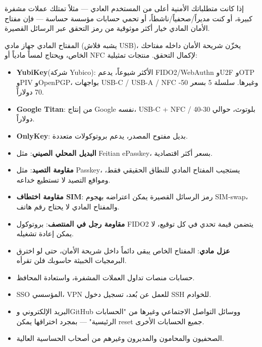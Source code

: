 
إذا كانت متطلباتك الأمنية أعلى من المستخدم العادي — مثلاً تمتلك عملات مشفرة كبيرة، أو كنت مديراً/صحفياً/ناشطاً، أو تحمي حسابات مؤسسة حساسة — فإن مفتاح الأمان المادي خيار أكثر موثوقية من رمز التحقق عبر الرسائل القصيرة.


المفتاح المادي جهاز مادي (يشبه فلاش USB)، يخزّن شريحة الأمان داخله مفتاحك الخاص، ويحتاج لمساً مادياً أو NFC لإكمال التحقق. منتجات تمثيلية:

\begin{itemize}
  \item \textbf{YubiKey}(شركة Yubico): الأكثر شيوعاً، يدعم FIDO2/WebAuthn وU2F وOTP وPIV وOpenPGP، بواجهات USB-C / USB-A / NFC وغيرها. سلسلة 5 بسعر 50-70 دولاراً.
  \item \textbf{Google Titan}: من إنتاج Google نفسه، USB-C + NFC / بلوتوث، حوالي 30-40 دولاراً.
  \item \textbf{OnlyKey}: بديل مفتوح المصدر، يدعم بروتوكولات متعددة.
  \item \textbf{البديل المحلي الصيني}: مثل Feitian ePasskey، بسعر أكثر اقتصادية.
\end{itemize}


\begin{itemize}
  \item \textbf{مقاومة التصيد}: مثل Passkey، يستجيب المفتاح المادي للنطاق الحقيقي فقط، ومواقع التصيد لا تستطيع خداعه.
  \item \textbf{مقاومة اختطاف SIM}: رمز الرسائل القصيرة يمكن اعتراضه بهجوم SIM-swap، والمفتاح المادي لا يحتاج رقم هاتف.
  \item \textbf{مقاومة رجل في المنتصف}: بروتوكول FIDO2 يتضمن قيمة تحدي في كل توقيع، لا يمكن إعادة تشغيله.
  \item \textbf{عزل مادي}: المفتاح الخاص يبقى دائماً داخل شريحة الأمان، حتى لو اخترق البرمجيات الخبيثة حاسوبك فلن تقرأه.
\end{itemize}


\begin{itemize}
  \item حسابات منصات تداول العملات المشفرة، واستعادة المحافظ.
  \item SSO المؤسسي، VPN للعمل عن بُعد، تسجيل دخول SSH للخوادم.
  \item البريد الإلكتروني وGitHub ووسائل التواصل الاجتماعي وغيرها من "الحسابات الرئيسية" — بمجرد اختراقها يمكن reset جميع الحسابات الأخرى.
  \item الصحفيون والمحامون والمديرون وغيرهم من أصحاب الحساسية العالية.
\end{itemize}

